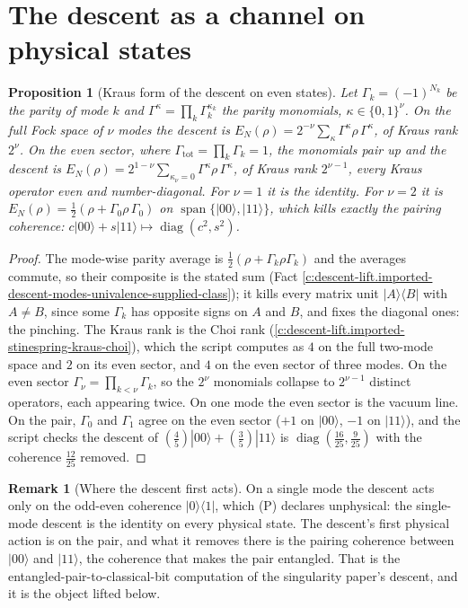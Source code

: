 \documentclass[11pt]{article}
\newtheorem{proposition}[theorem]{Proposition}
\theoremstyle{definition}
\newtheorem{remark}[theorem]{Remark}
\theoremstyle{plain}
\providecommand{\EN}{}\renewcommand{\EN}{E_{N}}
\providecommand{\G}{}\renewcommand{\G}{\Gamma}
\providecommand{\bra}{}\renewcommand{\bra}[1]{\langle #1|}
\providecommand{\ket}{}\renewcommand{\ket}[1]{|#1\rangle}
\begin{document}
\section{The descent as a channel on physical states}

\begin{proposition}[Kraus form of the descent on even states]\label{c:descent-lift.kraus-form-descent-even-states}
Let $\G_{k} = (-1)^{N_{k}}$ be the parity of mode $k$ and $\G^{\kappa} = \prod_{k}\G_{k}^{\kappa_{k}}$ the parity monomials, $\kappa \in \{0,1\}^{\nu}$. On the full Fock space of $\nu$ modes the descent is $\EN(\rho) = 2^{-\nu}\sum_{\kappa}\G^{\kappa}\rho\,\G^{\kappa}$, of Kraus rank $2^{\nu}$. On the even sector, where $\G_{\mathrm{tot}} = \prod_{k}\G_{k} = 1$, the monomials pair up and the descent is $\EN(\rho) = 2^{1-\nu}\sum_{\kappa_{\nu} = 0}\G^{\kappa}\rho\,\G^{\kappa}$, of Kraus rank $2^{\nu - 1}$, every Kraus operator even and number-diagonal. For $\nu = 1$ it is the identity. For $\nu = 2$ it is $\EN(\rho) = \tfrac12(\rho + \G_{0}\rho\,\G_{0})$ on $\operatorname{span}\{\ket{00}, \ket{11}\}$, which kills exactly the pairing coherence: $c\ket{00} + s\ket{11} \mapsto \operatorname{diag}(c^{2}, s^{2})$.
\end{proposition}
\begin{proof}
The mode-wise parity average is $\tfrac12(\rho + \G_{k}\rho\G_{k})$ and the averages commute, so their composite is the stated sum (Fact \ref{c:descent-lift.imported-descent-modes-univalence-supplied-class}); it kills every matrix unit $\ket{A}\bra{B}$ with $A \neq B$, since some $\G_{k}$ has opposite signs on $A$ and $B$, and fixes the diagonal ones: the pinching. The Kraus rank is the Choi rank (\ref{c:descent-lift.imported-stinespring-kraus-choi}), which the script computes as $4$ on the full two-mode space and $2$ on its even sector, and $4$ on the even sector of three modes. On the even sector $\G_{\nu} = \prod_{k < \nu}\G_{k}$, so the $2^{\nu}$ monomials collapse to $2^{\nu-1}$ distinct operators, each appearing twice. On one mode the even sector is the vacuum line. On the pair, $\G_{0}$ and $\G_{1}$ agree on the even sector ($+1$ on $\ket{00}$, $-1$ on $\ket{11}$), and the script checks the descent of $(\tfrac45)\ket{00} + (\tfrac35)\ket{11}$ is $\operatorname{diag}(\tfrac{16}{25}, \tfrac{9}{25})$ with the coherence $\tfrac{12}{25}$ removed.

\end{proof}

\begin{remark}[Where the descent first acts]\label{c:note.descent-lift.where-descent-first-acts}
On a single mode the descent acts only on the odd-even coherence $\ket{0}\bra{1}$, which (P) declares unphysical: the single-mode descent is the identity on every physical state. The descent's first physical action is on the pair, and what it removes there is the pairing coherence between $\ket{00}$ and $\ket{11}$, the coherence that makes the pair entangled. That is the entangled-pair-to-classical-bit computation of the singularity paper's descent, and it is the object lifted below.
\end{remark}
\end{document}
